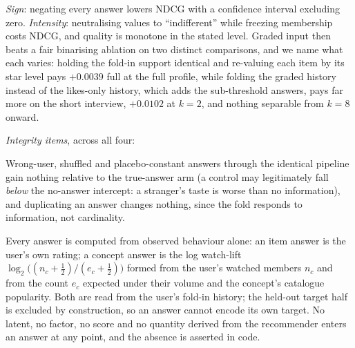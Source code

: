 \documentclass[manuscript,screen,review]{acmart}
\begin{document}
\begin{description}[leftmargin=2.4em,itemsep=1.5pt]
  \item[R4, expressive answers.] \emph{Sign}: negating every answer lowers NDCG with a confidence interval excluding zero. \emph{Intensity}: neutralising values to ``indifferent'' while freezing membership costs NDCG, and quality is monotone in the stated level. Graded input then beats a fair binarising ablation on two distinct comparisons, and we name what each varies: holding the fold-in support identical and re-valuing each item by its star level pays $+0.0039$ full at the full profile, while folding the graded history instead of the likes-only history, which adds the sub-threshold answers, pays far more on the short interview, $+0.0102$ at $k{=}2$, and nothing separable from $k{=}8$ onward.
\end{description}

\noindent\emph{Integrity items}, across all four:
\begin{description}[leftmargin=2.4em,itemsep=1.5pt]
  \item[Existential controls.] Wrong-user, shuffled and placebo-constant answers through the identical pipeline gain nothing relative to the true-answer arm (a control may legitimately fall \emph{below} the no-answer intercept: a stranger's taste is worse than no information), and duplicating an answer changes nothing, since the fold responds to information, not cardinality.
  \item[No recommender geometry in answers.] Every answer is computed from observed behaviour alone: an item answer is the user's own rating; a concept answer is the log watch-lift $\log_2\!\big((n_c+\tfrac12)/(e_c+\tfrac12)\big)$ formed from the user's watched members $n_c$ and from the count $e_c$ expected under their volume and the concept's catalogue popularity. Both are read from the user's fold-in history; the held-out target half is excluded by construction, so an answer cannot encode its own target. No latent, no factor, no score and no quantity derived from the recommender enters an answer at any point, and the absence is asserted in code.
\end{description}
\end{document}

